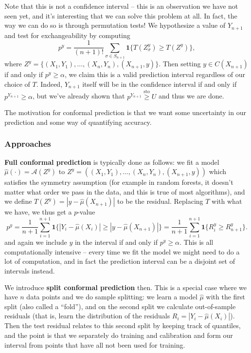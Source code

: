 Note that this is not a confidence interval -- this is an observation we have not seen yet, and it's interesting that we can solve this problem at all. In fact, the way we can do so is through permutation tests! We hypothesize a value of $Y_{n+1}$ and test for exchangeability by computing
\[
p^y = \frac{1}{(n+1)!} \sum_{\sigma \in S_{n+1}} \mathbf{1}\{T(Z^y_\sigma) \geq T(Z^y)\},
\]
where $Z^y = \{(X_1, Y_1), \ldots, (X_n, Y_n), (X_{n+1}, y)\}$. Then setting $y \in C(X_{n+1})$ if and only if $p^y \geq \alpha$, we claim this is a valid prediction interval regardless of our choice of $T$. Indeed, $Y_{n+1}$ itself will be in the confidence interval if and only if $p^{Y_{n+1}} \geq \alpha$, but we've already shown that $p^{Y_{n+1}} \stackrel{\text{sto}}{\geq} U$ and thus we are done.

The motivation for conformal prediction is that we want some uncertainty in our prediction and some way of quantifying accuracy.

\subsubsection{Approaches}
\textbf{Full conformal prediction}  is typically done as follows: we fit a model $\hat{\mu}(\cdot) = \mathcal{A}(Z^y)$ to $Z^y = ((X_1, Y_1), \ldots, (X_n, Y_n), (X_{n+1}, y))$ which satisfies the symmetry assumption (for example in random forests, it doesn't matter what order we pass in the data, and this is true of most algorithms), and we define $T(Z^y) = |y - \hat{\mu}(X_{n+1})|$ to be the residual. Replacing $T$ with what we have, we thus get a $p$-value
\[
p^y = \frac{1}{n+1} \sum_{i=1}^{n+1} \mathbf{1}\{|Y_i - \hat{\mu}(X_i)| \geq |y - \hat{\mu}(X_{n+1})|\} = \frac{1}{n+1} \sum_{i=1}^{n+1} \mathbf{1}\{R^y_i \geq R^y_{n+1}\}.
\]
and again we include $y$ in the interval if and only if $p^y\ge \alpha$. This is all computationally intensive – every time we fit the model we might need to do a lot of computation, and in fact the prediction interval can be a disjoint set of intervals instead.

We introduce \textbf{split conformal prediction} then. This is a special case where we have $n$ data points and we do sample splitting: we learn a model $\hat{\mu}$ with the first split (also called a ``fold''), and on the second split we calculate out-of-sample residuals (that is, learn the distribution of the residuals $R_i = |Y_i - \hat{\mu}(X_i)|$). Then the test residual relates to this second split by keeping track of quantiles, and the point is that we separately do training and calibration and form our interval from points that have all not been used for training.

